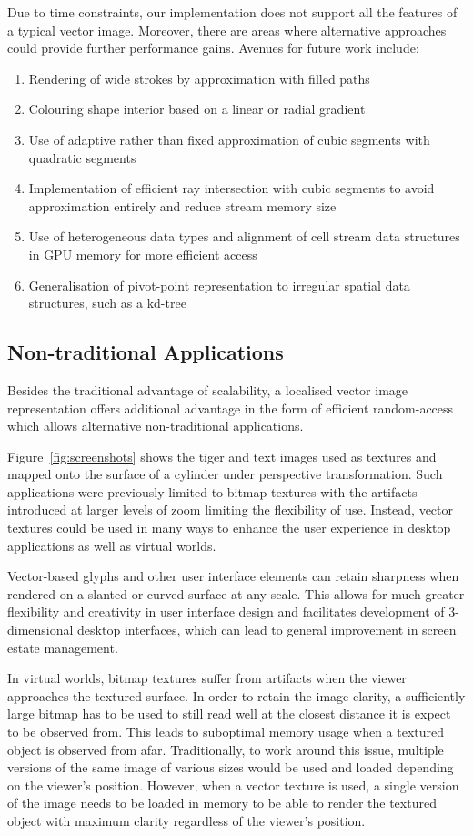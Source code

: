 \documentclass[11pt,a4paper,twoside]{article}
\begin{document}
Due to time constraints, our implementation does not support all the features of a typical vector image. Moreover, there are areas where alternative approaches could provide further performance gains. Avenues for future work include:

\begin {enumerate}
\item
Rendering of wide strokes by approximation with filled paths
\item
Colouring shape interior based on a linear or radial gradient
\item
Use of adaptive rather than fixed approximation of cubic segments with quadratic segments
\item
Implementation of efficient ray intersection with cubic segments to avoid approximation entirely and reduce stream memory size
\item
Use of heterogeneous data types and alignment of cell stream data structures in GPU memory for more efficient access
\item
Generalisation of pivot-point representation to irregular spatial data structures, such as a kd-tree
\end {enumerate}


\subsection {Non-traditional Applications}
Besides the traditional advantage of scalability, a localised vector image representation offers additional advantage in the form of efficient random-access which allows alternative non-traditional applications.

Figure~\ref{fig:screenshots} shows the tiger and text images used as textures and mapped onto the surface of a cylinder under perspective transformation. Such applications were previously limited to bitmap textures with the artifacts introduced at larger levels of zoom limiting the flexibility of use. Instead, vector textures could be used in many ways to enhance the user experience in desktop applications as well as virtual worlds.

Vector-based glyphs and other user interface elements can retain sharpness when rendered on a slanted or curved surface at any scale. This allows for much greater flexibility and creativity in user interface design and facilitates development of 3-dimensional desktop interfaces, which can lead to general improvement in screen estate management.

In virtual worlds, bitmap textures suffer from artifacts when the viewer approaches the textured surface. In order to retain the image clarity, a sufficiently large bitmap has to be used to still read well at the closest distance it is expect to be observed from. This leads to suboptimal memory usage when a textured object is observed from afar. Traditionally, to work around this issue, multiple versions of the same image of various sizes would be used and loaded depending on the viewer's position. However, when a vector texture is used, a single version of the image needs to be loaded in memory to be able to render the textured object with maximum clarity regardless of the viewer's position.

\newpage


\end{document}
